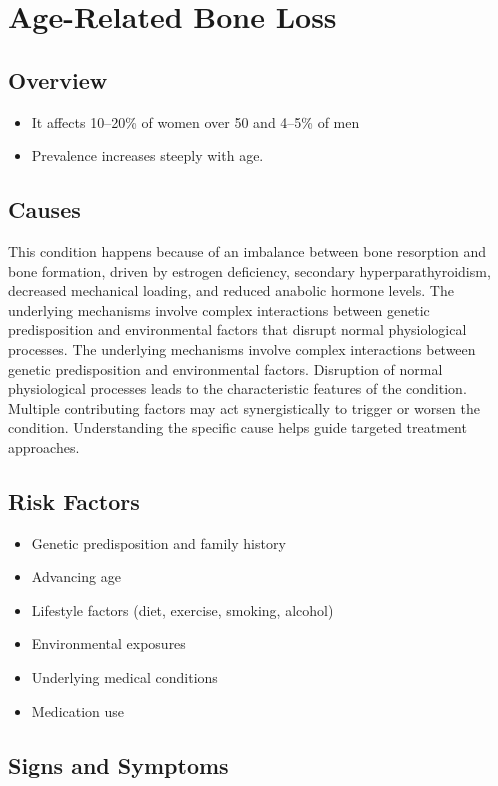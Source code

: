 \chapter{Age-Related Bone Loss}
\label{sec:Age-Related Bone Loss}

\section{Overview}


\begin{itemize}[noitemsep]
  \item It affects 10--20\% of women over 50 and 4--5\% of men
  \item Prevalence increases steeply with age.
\end{itemize}
\section{Causes}
This condition happens because of an imbalance between bone resorption and bone formation, driven by estrogen deficiency, secondary hyperparathyroidism, decreased mechanical loading, and reduced anabolic hormone levels. The underlying mechanisms involve complex interactions between genetic predisposition and environmental factors that disrupt normal physiological processes. The underlying mechanisms involve complex interactions between genetic predisposition and environmental factors. Disruption of normal physiological processes leads to the characteristic features of the condition. Multiple contributing factors may act synergistically to trigger or worsen the condition. Understanding the specific cause helps guide targeted treatment approaches.
\section{Risk Factors}


\begin{itemize}[noitemsep]
  \item Genetic predisposition and family history
  \item Advancing age
  \item Lifestyle factors (diet, exercise, smoking, alcohol)
  \item Environmental exposures
  \item Underlying medical conditions
  \item Medication use
\end{itemize}
\section{Signs and Symptoms}

